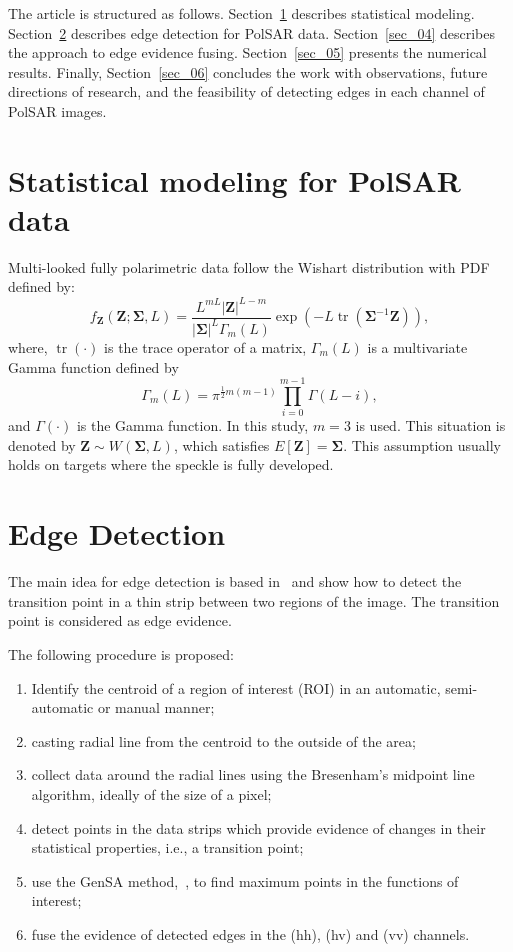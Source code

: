 \documentclass[journal]{IEEEtran}
\DeclareMathOperator{\traco}{tr}
\begin{document}
The article is structured as follows.
Section~\ref{sec_02} describes statistical modeling.
Section~\ref{sec_03} describes edge detection for PolSAR data.
Section~\ref{sec_04} describes the approach to edge evidence fusing.
Section~\ref{sec_05} presents the numerical results.
Finally, Section~\ref{sec_06} concludes the work with observations, future directions of research, and the feasibility of detecting edges in each channel of PolSAR images.

\section{Statistical modeling for PolSAR data}\label{sec_02}
Multi-looked fully polarimetric data follow the Wishart distribution with PDF defined by:
\begin{equation}
    f_{\mathbf{Z}}(\mathbf{Z};\mathbf{\Sigma},L)=\frac{L^{mL}|\mathbf{Z}|^{L-m}}{|\mathbf{\Sigma}|^{L}\Gamma_m(L)} \exp(-L\traco(\mathbf{\Sigma}^{-1}\mathbf{Z})),
    \label{eq_04}
\end{equation} 
where, $\traco(\cdot)$ is the trace operator of a matrix, $\Gamma_m(L)$ is a multivariate Gamma function defined by
\begin{equation*}
	\Gamma_m(L)=\pi^{\frac{1}{2}m(m-1)} \prod_{i=0}^{m-1}\Gamma(L-i),
\end{equation*}
and $\Gamma(\cdot)$ is the Gamma function.
In this study, $m=3$ is used. 
This situation is denoted by $\mathbf{Z}\sim W(\mathbf{\Sigma}, L)$, which satisfies $E[\mathbf{Z}]=\mathbf{\Sigma}$. 
This assumption usually holds on targets where the speckle is fully developed.

\section{Edge Detection}\label{sec_03}
The main idea for edge detection is based in~\cite{gmbf, fbgm, nhfc} and show how to detect the transition point in a thin strip between two regions of the image. The transition point is considered as edge evidence. 

The following procedure is proposed:
\begin{enumerate}
	\item Identify the centroid of a region of interest (ROI) in an automatic, semi-automatic or manual manner;
	\item casting radial line from the centroid to the outside of the area;
	\item collect data around the radial lines using the  Bresenham's midpoint line algorithm, ideally of the size of a pixel;
	\item detect points in the data strips which provide evidence of changes in their statistical properties, i.e., a transition point;
	\item use the GenSA method,~\cite{xgsh}, to find maximum points in the functions of interest;
	\item fuse the evidence of detected edges in the (hh), (hv) and (vv) channels.
\end{enumerate}
\end{document}
